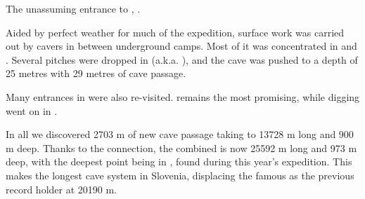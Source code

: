 \begin{marginfigure}
\checkoddpage \ifoddpage \forcerectofloat \else \forceversofloat \fi
\centering
 \caption{The unassuming entrance to , . }
 \label{m2 entrance}
\end{marginfigure}

Aided by perfect weather for much of the expedition, surface work was
carried out by cavers in between underground camps. Most of it was
concentrated in  and . Several pitches were dropped in  (a.k.a.
), and the cave was pushed to a depth of 25 metres with 29 metres of cave passage.

Many entrances in  were also re-visited.  remains the most
promising, while digging went on in .

In all we discovered 2703 m of new cave passage taking 
to 13728 m long and 900 m deep. Thanks to the connection, the combined
 is now 25592 m long and 973 m deep, with the deepest
point being  in , found during this
year's expedition. This makes  the longest cave system in
Slovenia, displacing the famous  as the previous record
holder at 20190 m.

